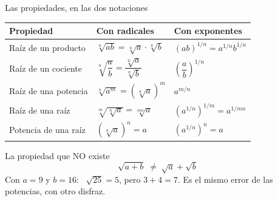 \documentclass[aspectratio=169,10pt]{beamer}
\begin{document}
\begin{frame}{Las propiedades, en las dos notaciones}
  \tiny
  \begin{center}
  \begin{tabular}{@{}p{3.2cm}p{3.6cm}p{4.6cm}@{}}
    \toprule
    \textbf{Propiedad} & \textbf{Con radicales} & \textbf{Con exponentes} \\
    \midrule
    Raíz de un producto &
      $\sqrt[n]{ab} = \sqrt[n]{a}\cdot\sqrt[n]{b}$ &
      $(ab)^{1/n} = a^{1/n}b^{1/n}$ \\
    Raíz de un cociente &
      $\sqrt[n]{\dfrac{a}{b}} = \dfrac{\sqrt[n]{a}}{\sqrt[n]{b}}$ &
      $\left(\dfrac{a}{b}\right)^{1/n}$ \\
    Raíz de una potencia &
      $\sqrt[n]{a^{m}} = \left(\sqrt[n]{a}\right)^{m}$ &
      $a^{m/n}$ \\
    Raíz de una raíz &
      $\sqrt[m]{\sqrt[n]{a}} = \sqrt[mn]{a}$ &
      $\left(a^{1/n}\right)^{1/m} = a^{1/mn}$ \\
    Potencia de una raíz &
      $\left(\sqrt[n]{a}\right)^{n} = a$ &
      $\left(a^{1/n}\right)^{n} = a$ \\
    \bottomrule
  \end{tabular}
  \end{center}

  \vspace{0.08cm}
  \begin{alertblock}{La propiedad que NO existe}
    \scriptsize
    \[ \sqrt{a+b} \;\neq\; \sqrt{a}+\sqrt{b} \]
    Con $a=9$ y $b=16$: \ $\sqrt{25} = 5$, pero $3+4 = 7$.  Es el mismo
    error de las potencias, con otro disfraz.
  \end{alertblock}
\end{frame}
\end{document}
